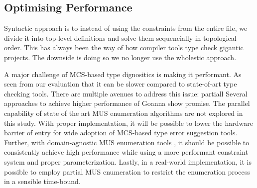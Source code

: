 \documentclass[pdflatex,sn-mathphys-num]{sn-jnl}%
\begin{document}
 




    
    
    \subsection{Optimising Performance}
    Syntactic approach is to instead of using the constraints from the entire file, we divide it into top-level definitions and solve them sequencially in topological order. This has always been the way of how compiler tools type check gigantic projects. The downside is doing so we no longer use the  wholestic approach.

    A major challenge of MCS-based type dignositics is making it performant. As seen from our evaluation that it can be slower compared to state-of-art type checking tools. There are multiple avenues to address this issue: partiall
   Several approaches to achieve higher performance of Goanna show promise. The parallel capability of state of the art MUS enumeration \cite{Zhao2016-bu} algorithms are not explored in this study. With proper implementation, it will be possible to lower the hardware barrier of entry for wide adoption of MCS-based type error suggestion tools. Further, with domain-agnostic MUS enumeration tools \cite{Bendik2020-pz}, it should be possible to consistently achieve high performance while using a more performant constraint system and proper parameterization. Lastly, in a real-world implementation, it is possible to employ partial MUS enumeration \cite{Previti2013-mr,Liffiton2016-xi} to restrict the enumeration process in a sensible time-bound.
\end{document}
